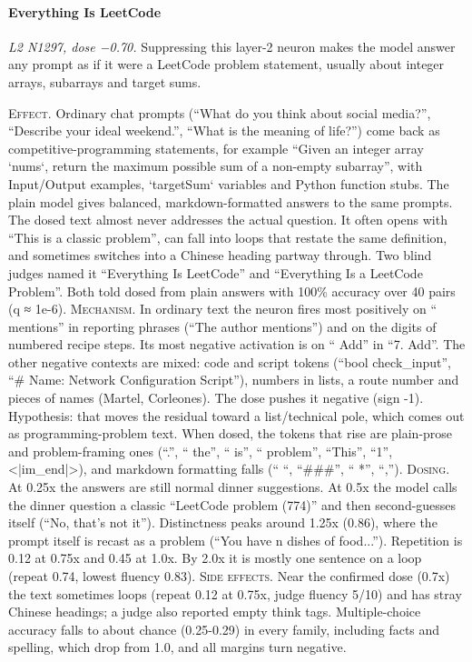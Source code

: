 \paragraph{Everything Is LeetCode} \textit{L2 N1297, dose −0.70.} Suppressing this layer-2 neuron makes the model answer any prompt as if it were a LeetCode problem statement, usually about integer arrays, subarrays and target sums.

\noindent\textsc{Effect.} Ordinary chat prompts (“What do you think about social media?”, “Describe your ideal weekend.”, “What is the meaning of life?”) come back as competitiv\allowbreak{}e-programm\allowbreak{}ing statements, for example “Given an integer array `nums`, return the maximum possible sum of a non-empty subarray”, with Input/Output examples, `targetSum` variables and Python function stubs. The plain model gives balanced, markdown-formatted answers to the same prompts. The dosed text almost never addresses the actual question. It often opens with “This is a classic problem”, can fall into loops that restate the same definition, and sometimes switches into a Chinese heading partway through. Two blind judges named it “Everything Is LeetCode” and “Everything Is a LeetCode Problem”. Both told dosed from plain answers with 100\% accuracy over 40 pairs (q ≈ 1e-6). \textsc{Mechanism.} In ordinary text the neuron fires most positively on “ mentions” in reporting phrases (“The author mentions”) and on the digits of numbered recipe steps. Its most negative activation is on “ Add” in “7. Add”. The other negative contexts are mixed: code and script tokens (“bool check\_input”, “\# Name: Network Configuration Script”), numbers in lists, a route number and pieces of names (Martel, Corleones). The dose pushes it negative (sign -1). Hypothesis: that moves the residual toward a list/technical pole, which comes out as programming-problem text. When dosed, the tokens that rise are plain-prose and problem-framing ones (“.”, “ the”, “ is”, “ problem”, “This”, “1”, <|im\_end|>), and markdown formatting falls (“ “, “\#\#\#”, “ *”, “,”). \textsc{Dosing.} At 0.25x the answers are still normal dinner suggestions. At 0.5x the model calls the dinner question a classic “LeetCode problem (774)” and then second-guesses itself (“No, that's not it”). Distinctness peaks around 1.25x (0.86), where the prompt itself is recast as a problem (“You have n dishes of food...”). Repetition is 0.12 at 0.75x and 0.45 at 1.0x. By 2.0x it is mostly one sentence on a loop (repeat 0.74, lowest fluency 0.83). \textsc{Side effects.} Near the confirmed dose (0.7x) the text sometimes loops (repeat 0.12 at 0.75x, judge fluency 5/10) and has stray Chinese headings; a judge also reported empty think tags. Multiple-choice accuracy falls to about chance (0.25-0.29) in every family, including facts and spelling, which drop from 1.0, and all margins turn negative.

